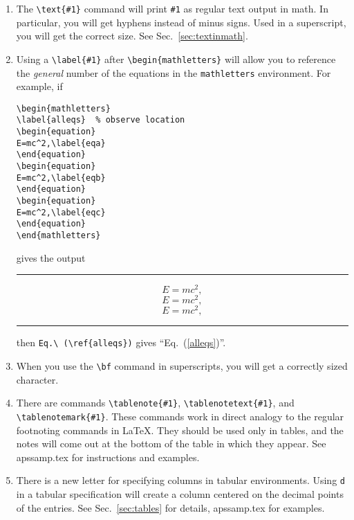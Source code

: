 \begin{enumerate}
\item The \verb+\text{#1}+ command will print \verb+#1+ as regular text
output in math. In particular, you will get hyphens instead of minus signs.
Used in a superscript, you will get the correct size. See Sec.\
\ref{sec:textinmath}.

\item Using a \verb+\label{#1}+ after \verb+\begin{mathletters}+ will allow
you to reference the {\em general\/} number of the equations in the
\verb+mathletters+ environment. For example, if
\begin{verbatim}
\begin{mathletters}
\label{alleqs}  % observe location
\begin{equation}
E=mc^2,\label{eqa}
\end{equation}
\begin{equation}
E=mc^2,\label{eqb}
\end{equation}
\begin{equation}
E=mc^2,\label{eqc}
\end{equation}
\end{mathletters}
\end{verbatim}
gives the output
\smallskip\hrule\smallskip
\begin{mathletters}
\label{alleqs}
\begin{equation}
E=mc^2,\label{eqa}
\end{equation}
\begin{equation}
E=mc^2,\label{eqb}
\end{equation}
\begin{equation}
E=mc^2,\label{eqc}
\end{equation}
\end{mathletters}
\smallskip\hrule\smallskip
then \verb+Eq.\ (\ref{alleqs})+ gives ``Eq.\ (\ref{alleqs})''.

\item When you use the \verb+\bf+ command in superscripts, you will get a
correctly sized character.


\item There are commands \verb+\tablenote{#1}+, \verb+\tablenotetext{#1}+,
and \verb+\tablenotemark{#1}+. These commands work in direct analogy to the
regular footnoting commands in \LaTeX{}. They should be used only in
tables, and the notes will come out at the bottom of the table in which
they appear. See apssamp.tex for instructions and examples.

\item There is a new letter for specifying columns in tabular environments.
Using \verb+d+ in a tabular specification will create a column centered on
the decimal points of the entries. See Sec.\ \ref{sec:tables} for details,
apssamp.tex for examples.



\end{enumerate}
